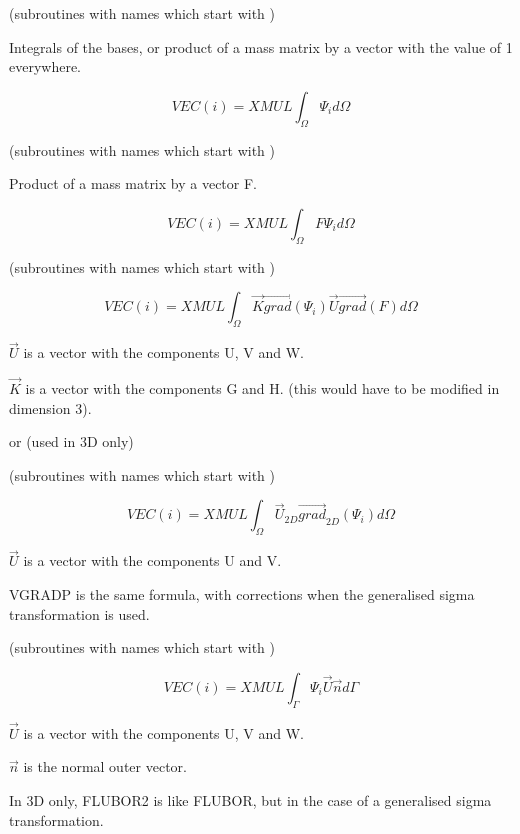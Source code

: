 
(subroutines with names which start with )

Integrals of the bases, or product of a mass matrix by a vector with the value
of 1 everywhere.

\[VEC(i)=XMUL \int _{\Omega }\Psi _{i} d\Omega  \]


(subroutines with names which start with )

Product of a mass matrix by a vector F.

\[VEC(i)=XMUL \int _{\Omega }F \Psi _{i} d\Omega  \]


(subroutines with names which start with )

\[VEC(i)=XMUL
\int _{\Omega }
\vec{K} \overrightarrow{grad} ( \Psi _{i}  )
\vec{U} \overrightarrow{grad} ( F ) d\Omega  \]

$\vec{U}$ is a vector with the components U, V and W.

$\vec{K}$ is a vector with the components G and H. (this would have to be
modified in dimension 3).

   or  
(used in 3D only)

(subroutines with names which start with )

\[VEC(i)=XMUL \int _{\Omega }\vec{U}_{2D}  \overrightarrow{grad} _{2D} ( \Psi _{i}  )  d\Omega  \]

$\vec{U}$ is a vector with the components U and V.

VGRADP is the same formula, with corrections when the generalised sigma
transformation is used.


(subroutines with names which start with )

\[VEC(i)=XMUL \int _{\Gamma } \Psi _{i}   \vec{U} \vec{n} d\Gamma  \]

$\vec{U}$ is a vector with the components U, V and W.

$\vec{n}$ is the normal outer vector.


In 3D only, FLUBOR2 is like FLUBOR, but in the case of a generalised sigma transformation.

